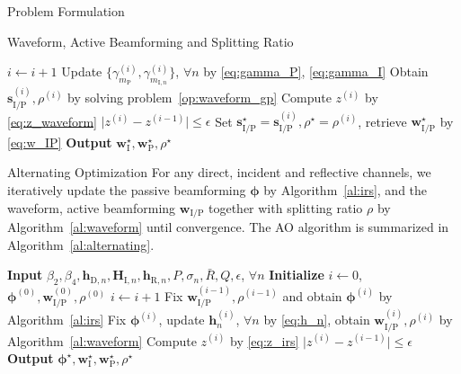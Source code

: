 \documentclass[journal]{IEEEtran}
\begin{document}
\begin{section}{Problem Formulation}
\begin{subsection}{Waveform, Active Beamforming and Splitting Ratio}
\begin{algorithm}[!t]
\begin{algorithmic}[1]
						\State $i \gets i + 1$
						\State Update $\{\gamma_{m_\mathrm{P}}^{(i)},\gamma_{m_{\mathrm{I},n}}^{(i)}\}$, $\forall n$ by \eqref{eq:gamma_P}, \eqref{eq:gamma_I}
						\State Obtain $\boldsymbol{s}_{\mathrm{I/P}}^{(i)},\rho^{(i)}$ by solving problem~\eqref{op:waveform_gp}
						\State Compute $z^{(i)}$ by \eqref{eq:z_waveform}
					\Until $\lvert z^{(i)} - z^{(i-1)} \rvert \le \epsilon$
					\State Set $\boldsymbol{s}_{\mathrm{I/P}}^{\star}=\boldsymbol{s}_{\mathrm{I/P}}^{(i)},\rho^{\star}=\rho^{(i)}$, retrieve $\boldsymbol{w}_{\mathrm{I/P}}^{\star}$ by \eqref{eq:w_IP}
					\State \textbf{Output} $\boldsymbol{w}_{\mathrm{I}}^{\star},\boldsymbol{w}_{\mathrm{P}}^{\star},\rho^{\star}$
				\end{algorithmic}
			\end{algorithm}
		\end{subsection}


		\begin{subsection}{Alternating Optimization}
			For any direct, incident and reflective channels, we iteratively update the passive beamforming $\boldsymbol{\phi}$ by Algorithm~\ref{al:irs}, and the waveform, active beamforming $\boldsymbol{w}_{\mathrm{I/P}}$ together with splitting ratio $\rho$ by Algorithm~\ref{al:waveform} until convergence. The AO algorithm is summarized in Algorithm~\ref{al:alternating}.
			\begin{algorithm}[!t]
				\caption{AO: Waveform, Active and Passive Beamforming, and Splitting Ratio.}
				\label{al:alternating}
				\begin{algorithmic}[1]
					\State \textbf{Input} $\beta_2,\beta_4,\boldsymbol{h}_{\mathrm{D},n},\boldsymbol{H}_{\mathrm{I},n},\boldsymbol{h}_{\mathrm{R},n},P,\sigma_n,\bar{R},Q,\epsilon$, $\forall n$
					\State \textbf{Initialize} $i \gets 0$, $\boldsymbol{\phi}^{(0)},\boldsymbol{w}_{\mathrm{I/P}}^{(0)},\rho^{(0)}$
					\Repeat
						\State $i \gets i + 1$
						\State Fix $\boldsymbol{w}_{\mathrm{I/P}}^{(i-1)},\rho^{(i-1)}$ and obtain $\boldsymbol{\phi}^{(i)}$ by Algorithm~\ref{al:irs}
						\State Fix $\boldsymbol{\phi}^{(i)}$, update $\boldsymbol{h}_n^{(i)}$, $\forall n$ by \eqref{eq:h_n}, obtain $\boldsymbol{w}_{\mathrm{I/P}}^{(i)}, \rho^{(i)}$ by Algorithm~\ref{al:waveform}
						\State Compute $z^{(i)}$ by \eqref{eq:z_irs}
					\Until $\lvert z^{(i)} - z^{(i-1)} \rvert \le \epsilon$
					\State \textbf{Output} $\boldsymbol{\phi}^{\star},\boldsymbol{w}_{\mathrm{I}}^{\star},\boldsymbol{w}_{\mathrm{P}}^{\star},\rho^{\star}$
				\end{algorithmic}
			\end{algorithm}
		\end{subsection}



\end{section}
\end{document}
